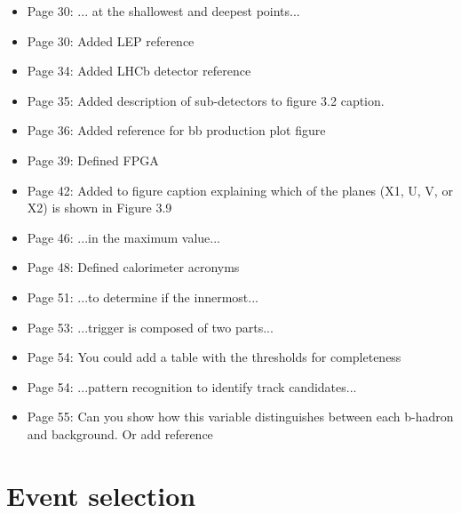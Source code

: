\documentclass[12pt]{article}
\begin{document}
\begin{itemize}
\item Page 30: ... at the {\color{red}shallowest and deepest} points...
\item Page 30: Added LEP reference
\item Page 34: Added LHCb detector reference
\item Page 35: Added description of sub-detectors to figure 3.2 caption.
\item Page 36: Added reference for bb production plot figure
\item Page 39: Defined FPGA
\item Page 42: Added to figure caption explaining which of the planes (X1, U, V, or X2) is shown in Figure 3.9
\item Page 46: ...in the {\color{red}maximum} value...
\item Page 48: Defined calorimeter acronyms
\item Page 51: ...to determine {\color{red}if} the innermost...
\item Page 53: ...trigger is composed {\color{red}of} two parts...
\item Page 54: {\color{blue} You could add a table with the thresholds for completeness}
\item Page 54: ...pattern recognition {\color{red}to} identify track candidates...
\item Page 55: {\color{blue}Can you show how this variable distinguishes between each b-hadron and background. Or add reference}
\end{itemize}

\section{Event selection}
\end{document}
